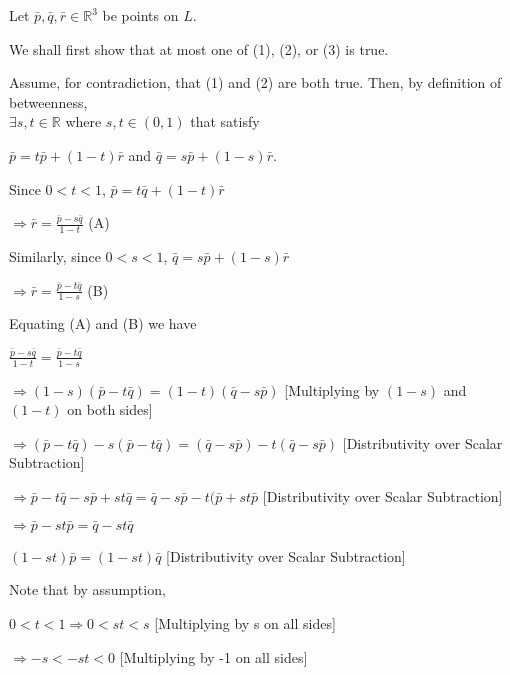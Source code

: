 \begin{proofbox}

  Let  $\bar{p}, \bar{q}, \bar{r} \in \mathbb{R}^3$ be points on $L$.

  We shall first show that at most one of (1), (2), or (3) is true.

  Assume, for contradiction, that (1) and (2) are both true. Then, by definition of betweenness,\\
  $\exists s,t \in \mathbb{R}$ where $s,t \in (0,1)$ that satisfy

  $\bar{p} = t\bar{p} + (1 - t)\bar{r}$ and $\bar{q} = s\bar{p} + (1 - s)\bar{r}$.

  \vspace{1em}

  Since $0 < t < 1$, $\bar{p} = t\bar{q} + (1 - t)\bar{r}$

  $\Rightarrow \bar{r} = \frac{\bar{p}-s\bar{q}}{1-t}$ \hfill (A)

  Similarly, since $0 < s < 1$, $\bar{q} = s\bar{p} + (1 - s)\bar{r}$

  $\Rightarrow \bar{r} = \frac{\bar{p}-t\bar{q}}{1-s}$ \hfill (B)

  \vspace{1em}

  Equating (A) and (B) we have

  $\frac{\bar{p}-s\bar{q}}{1-t} = \frac{\bar{p}-t\bar{q}}{1-s}$

  \quad $\Rightarrow (1-s)(\bar{p}-t\bar{q}) = (1-t)(\bar{q}-s\bar{p})$ \hfill [Multiplying by $(1-s)$ and $(1-t)$ on both sides]

  \quad $\Rightarrow (\bar{p}-t\bar{q}) - s(\bar{p}-t\bar{q}) = (\bar{q}-s\bar{p})-t(\bar{q}-s\bar{p})$ \hfill [Distributivity over Scalar Subtraction]

  \quad $\Rightarrow \bar{p} - t\bar{q} - s\bar{p} + st\bar{q} = \bar{q} - s\bar{p} - t(\bar{p} + st\bar{p}$ \hfill [Distributivity over Scalar Subtraction]

  \quad $\Rightarrow \bar{p} - st\bar{p} = \bar{q} - st\bar{q}$ 

  \quad $(1-st)\bar{p} = (1-st)\bar{q}$ \hfill [Distributivity over Scalar Subtraction]

  \vspace{1em}

  Note that by assumption, 
  
  $0 < t < 1 \Rightarrow 0 < st < s$ \hfill [Multiplying by s on all sides]

  \quad $\Rightarrow -s < -st < 0$ \hfill [Multiplying by -1 on all sides]


\end{proofbox}

